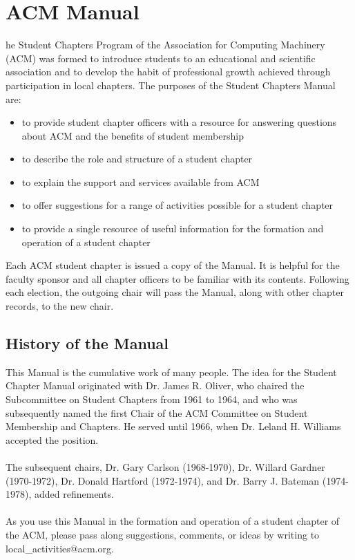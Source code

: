 %
%
\let\textcircled=\pgftextcircled
\chapter{ACM Manual}
\label{chap:manual}

he Student Chapters Program of the Association for Computing Machinery (ACM) was formed to introduce students to an educational and scientific association and to develop the habit of professional growth achieved through participation in local chapters. The purposes of the Student Chapters Manual are:
	\begin{itemize}
		\item to provide student chapter officers with a resource for answering 				questions about ACM and the benefits of student membership
      \item to describe the role and structure of a student chapter
		\item to explain the support and services available from ACM
		\item to offer suggestions for a range of activities possible for a student chapter
		\item to provide a single resource of useful information for the formation 				and operation of a student chapter
	\end{itemize}

Each ACM student chapter is issued a copy of the Manual. It is helpful for the faculty sponsor and all chapter officers to be familiar with its contents. Following each election, the outgoing chair will pass the Manual, along with other chapter records, to the new chair.

\section{History of the Manual}
\label{sec:sec01}

This Manual is the cumulative work of many people. The idea for the Student Chapter Manual originated with Dr. James R. Oliver, who chaired the Subcommittee on Student Chapters from 1961 to 1964, and who was subsequently named the first Chair of the ACM Committee on Student Membership and Chapters. He served until 1966, when Dr. Leland H. Williams accepted the position.
\\
\\
The subsequent chairs, Dr. Gary Carlson (1968-1970), Dr. Willard Gardner (1970-1972), Dr. Donald Hartford (1972-1974), and Dr. Barry J. Bateman (1974-1978), added refinements.
\\
\\
As you use this Manual in the formation and operation of a student chapter of the ACM, please pass along suggestions, comments, or ideas by writing to local\_activities@acm.org.

